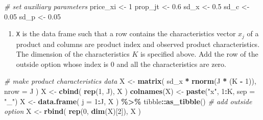\documentclass[
]{book}
\newenvironment{Shaded}{\begin{snugshade}}{\end{snugshade}}
\newcommand{\AttributeTok}[1]{\textcolor[rgb]{0.13,0.29,0.53}{#1}}
\newcommand{\CommentTok}[1]{\textcolor[rgb]{0.56,0.35,0.01}{\textit{#1}}}
\newcommand{\DecValTok}[1]{\textcolor[rgb]{0.00,0.00,0.81}{#1}}
\newcommand{\FloatTok}[1]{\textcolor[rgb]{0.00,0.00,0.81}{#1}}
\newcommand{\FunctionTok}[1]{\textcolor[rgb]{0.13,0.29,0.53}{\textbf{#1}}}
\newcommand{\NormalTok}[1]{#1}
\newcommand{\OtherTok}[1]{\textcolor[rgb]{0.56,0.35,0.01}{#1}}
\newcommand{\SpecialCharTok}[1]{\textcolor[rgb]{0.81,0.36,0.00}{\textbf{#1}}}
\newcommand{\StringTok}[1]{\textcolor[rgb]{0.31,0.60,0.02}{#1}}
\providecommand{\tightlist}{%
  \setlength{\itemsep}{0pt}\setlength{\parskip}{0pt}}
\begin{document}
\begin{Shaded}
\begin{Highlighting}[]
\CommentTok{\# set auxiliary parameters}
\NormalTok{price\_xi }\OtherTok{\textless{}{-}} \DecValTok{1}
\NormalTok{prop\_jt }\OtherTok{\textless{}{-}} \FloatTok{0.6}
\NormalTok{sd\_x }\OtherTok{\textless{}{-}} \FloatTok{0.5}
\NormalTok{sd\_c }\OtherTok{\textless{}{-}} \FloatTok{0.05}
\NormalTok{sd\_p }\OtherTok{\textless{}{-}} \FloatTok{0.05}
\end{Highlighting}
\end{Shaded}

\begin{enumerate}
\def\labelenumi{\arabic{enumi}.}
\setcounter{enumi}{1}
\tightlist
\item
  \texttt{X} is the data frame such that a row contains the characteristics vector \(x_{j}\) of a product and columns are product index and observed product characteristics. The dimension of the characteristics \(K\) is specified above. Add the row of the outside option whose index is \(0\) and all the characteristics are zero.
\end{enumerate}

\begin{Shaded}
\begin{Highlighting}[]
\CommentTok{\# make product characteristics data}
\NormalTok{X }\OtherTok{\textless{}{-}} 
  \FunctionTok{matrix}\NormalTok{(}
\NormalTok{    sd\_x }\SpecialCharTok{*} \FunctionTok{rnorm}\NormalTok{(J }\SpecialCharTok{*}\NormalTok{ (K }\SpecialCharTok{{-}} \DecValTok{1}\NormalTok{)), }
    \AttributeTok{nrow =}\NormalTok{ J}
\NormalTok{    )}
\NormalTok{X }\OtherTok{\textless{}{-}} 
  \FunctionTok{cbind}\NormalTok{(}
    \FunctionTok{rep}\NormalTok{(}\DecValTok{1}\NormalTok{, J), }
\NormalTok{    X}
\NormalTok{    )}
\FunctionTok{colnames}\NormalTok{(X) }\OtherTok{\textless{}{-}} \FunctionTok{paste}\NormalTok{(}\StringTok{"x"}\NormalTok{, }\DecValTok{1}\SpecialCharTok{:}\NormalTok{K, }\AttributeTok{sep =} \StringTok{"\_"}\NormalTok{)}
\NormalTok{X }\OtherTok{\textless{}{-}} 
  \FunctionTok{data.frame}\NormalTok{(}
    \AttributeTok{j =} \DecValTok{1}\SpecialCharTok{:}\NormalTok{J,}
\NormalTok{    X}
\NormalTok{    ) }\SpecialCharTok{\%\textgreater{}\%}
\NormalTok{  tibble}\SpecialCharTok{::}\FunctionTok{as\_tibble}\NormalTok{()}
\CommentTok{\# add outside option}
\NormalTok{X }\OtherTok{\textless{}{-}} 
  \FunctionTok{rbind}\NormalTok{(}
    \FunctionTok{rep}\NormalTok{(}\DecValTok{0}\NormalTok{, }\FunctionTok{dim}\NormalTok{(X)[}\DecValTok{2}\NormalTok{]),}
\NormalTok{    X}
\NormalTok{    ) }
\end{Highlighting}
\end{Shaded}
\end{document}

